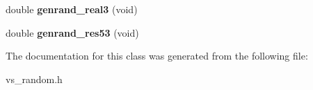\begin{DoxyCompactItemize}
\item 
double {\bfseries genrand\+\_\+real3} (void)\hypertarget{classVSRandom_a073ade9531acd36509fc554ec5897fc2}{}\label{classVSRandom_a073ade9531acd36509fc554ec5897fc2}

\item 
double {\bfseries genrand\+\_\+res53} (void)\hypertarget{classVSRandom_aed50f2c9082dbbdd257f17094cb1af2d}{}\label{classVSRandom_aed50f2c9082dbbdd257f17094cb1af2d}

\end{DoxyCompactItemize}


The documentation for this class was generated from the following file\+:\begin{DoxyCompactItemize}
\item 
vs\+\_\+random.\+h\end{DoxyCompactItemize}
